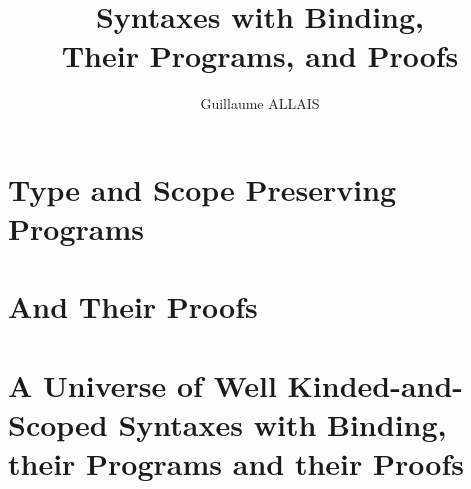 \documentclass{memoir}
\title{\Huge Syntaxes with Binding, \\ Their Programs, and Proofs}
\author{\Large Guillaume ALLAIS}
\begin{document}
\frontmatter

\cleardoublepage{}

\maketitle{}

\mainmatter
\pagestyle{ruled}
\begin{KeepFromToc}
\tableofcontents
\end{KeepFromToc}






\part{Type and Scope Preserving Programs}
\label{type-scope-semantics}






\part{And Their Proofs}
\label{properties}





\part{A Universe of Well Kinded-and-Scoped Syntaxes with Binding, their Programs and their Proofs}
\label{a-universe}













\cleardoublepage{}
\listoffigures


\end{document}
